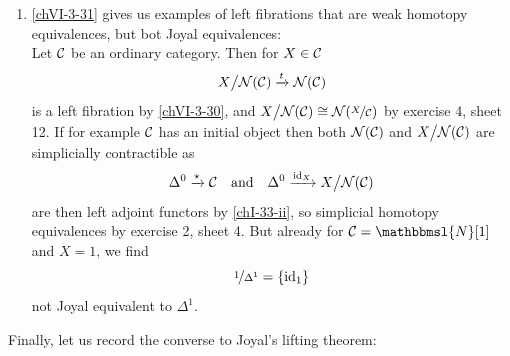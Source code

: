 \begin{enumerate}[label=\roman*)]
            \item
                \ref{chVI-3-31} gives us examples of left fibrations that are weak homotopy equivalences, but bot Joyal equivalences:\\
                Let $\mathcal{C}$ be an ordinary category. Then for $X \in \mathcal{C}$
                \begin{equation*}
                    X \big/ \mathcal{N}(\mathcal{C}) \xrightarrow{t} \mathcal{N}(\mathcal{C})
                \end{equation*}	
                is a left fibration by \ref{chVI-3-30}, and $X \big/ \mathcal{N}(\mathcal{C}) \cong \mathcal{N}(\nicefrac{X}{\mathcal{C}})$ by exercise 4, sheet 12. If for example $\mathcal{C}$ has an initial object then both $\mathcal{N}(\mathcal{C})$ and $X \big/ \mathcal{N}(\mathcal{C})$ are simplicially contractible as
                \begin{equation*}
                    \Delta^0 \xrightarrow{\star} \mathcal{C} \quad \text{and} \quad \Delta^0 \xrightarrow{\operatorname{id}_X} X \big/ \mathcal{N}(\mathcal{C})
                \end{equation*}
                are then left adjoint functors by \ref{chI-33-ii}, so simplicial homotopy equivalences by exercise 2, sheet 4. But already for $\Cc = \mathbbmsl{N}[1]$ and $X = 1$, we find 
                \begin{equation*}
                    \nicefrac{1}{\Delta^1} = \{ \operatorname{id}_1\}	
                \end{equation*}
                not Joyal equivalent to $\Delta^1$.
        \end{enumerate}

        Finally, let us record the converse to Joyal's lifting theorem:

